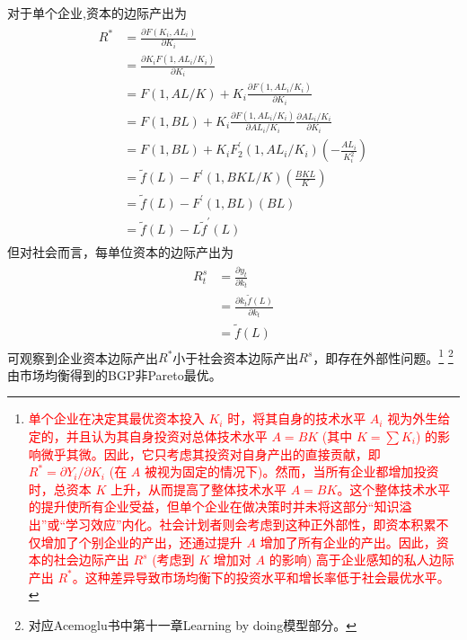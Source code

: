 \documentclass[cn,normal,11pt,black]{elegantnote}
\begin{document}
\begin{corollary}
    对于单个企业,资本的边际产出为
    \begin{align}
    \begin{aligned}
        R^* & = \frac{\partial F(K_i,AL_i)}{\partial K_i} \\
          & = \frac{\partial K_i F(1,A L_i/K_i)}{\partial K_i} \\
          & = F(1, A L/K) + K_i \frac{\partial F(1,AL_i/K_i)}{\partial K_i} \\
          & = F(1, BL) + K_i \frac{\partial F(1,AL_i/K_i)}{\partial AL_i/K_i} \frac{\partial AL_i/K_i}{\partial K_i} \\
          & = F(1, BL) + K_i F_2^\prime(1,AL_i/K_i)(- \frac{AL_i}{K_i^2}) \\
          & = \tilde f(L) - F^\prime(1,BKL/K)(\frac{BKL}{K}) \\
          & = \tilde f(L) - F^\prime(1,BL)(BL) \\
          & = \tilde f(L) - L\tilde f^\prime(L)
    \end{aligned}
    \end{align}
    但对社会而言，每单位资本的边际产出为
    \begin{align}
    \begin{aligned}
        R^{s}_t & = \frac{\partial y_t}{\partial k_t}  \\
          & = \frac{\partial k_t \tilde f(L)}{\partial k_t}  \\
          & = \tilde f(L)
    \end{aligned}
    \end{align}
    可观察到企业资本边际产出$R^*$小于社会资本边际产出$R^s$，即存在外部性问题。\footnote{\textcolor{red}{单个企业在决定其最优资本投入 $K_i$ 时，将其自身的技术水平 $A_i$ 视为外生给定的，并且认为其自身投资对总体技术水平 $A = BK$ (其中 $K = \sum K_i$) 的影响微乎其微。因此，它只考虑其投资对自身产出的直接贡献，即 $R^* = \partial Y_i / \partial K_i$ (在 $A$ 被视为固定的情况下)。然而，当所有企业都增加投资时，总资本 $K$ 上升，从而提高了整体技术水平 $A=BK$。这个整体技术水平的提升使所有企业受益，但单个企业在做决策时并未将这部分“知识溢出”或“学习效应”内化。社会计划者则会考虑到这种正外部性，即资本积累不仅增加了个别企业的产出，还通过提升 $A$ 增加了所有企业的产出。因此，资本的社会边际产出 $R^s$ (考虑到 $K$ 增加对 $A$ 的影响) 高于企业感知的私人边际产出 $R^*$。这种差异导致市场均衡下的投资水平和增长率低于社会最优水平。}}
    \footnote{对应Acemoglu书中第十一章Learning by doing模型部分。}
    由市场均衡得到的BGP非Pareto最优。


\end{corollary}
\end{document}
